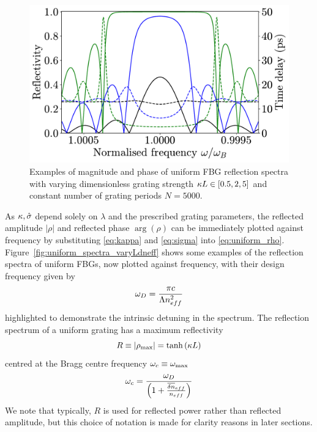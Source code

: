 %
\begin{figure}
    
\includegraphics[width=\linewidth]{Images/Introduction/Uniform_varying_kL_Rtau.pdf}

\caption{Examples of magnitude and phase of uniform FBG reflection spectra with varying dimensionless grating strength $\kappa L \in [0.5, 2, 5]$ and constant number of grating periods $N=5000$.}

\label{fig:uniform_spectra_varykL}
\end{figure}
%
\par
%
As $\kappa, \hat{\sigma}$ depend solely on $\lambda$ and the prescribed grating parameters, 
the reflected amplitude $|\rho|$ and reflected phase $\arg(\rho)$ can be immediately plotted against frequency by substituting \eqref{eq:kappa} and \eqref{eq:sigma} into \eqref{eq:uniform_rho}. 
Figure~\ref{fig:uniform_spectra_varyLdneff} shows some examples of the reflection spectra of uniform FBGs, now plotted against frequency, with their design frequency given by
%
\begin{equation}
    \omega_D = \frac{\pi c}{\Lambda n_{eff}^2}
\end{equation}
%
highlighted to demonstrate the intrinsic detuning in the spectrum. The reflection spectrum of a uniform grating has a maximum reflectivity 
%
\begin{equation}
\label{eq:rmax}
    R \equiv |\rho_\text{max}| = \tanh{(\kappa L)}
\end{equation}
%
centred at the Bragg centre frequency $\omega_c \equiv \omega_\text{max}$
%
\begin{equation}
\label{eq:wBragg}
    \omega_c = \frac{\omega_D}{\left( 1 + \frac{\overline{\delta n}_{eff} }{n_{eff}}\right)}
\end{equation}
%
We note that typically, $R$ is used for reflected power rather than reflected amplitude, but this choice of notation is made for clarity reasons in later sections. 
